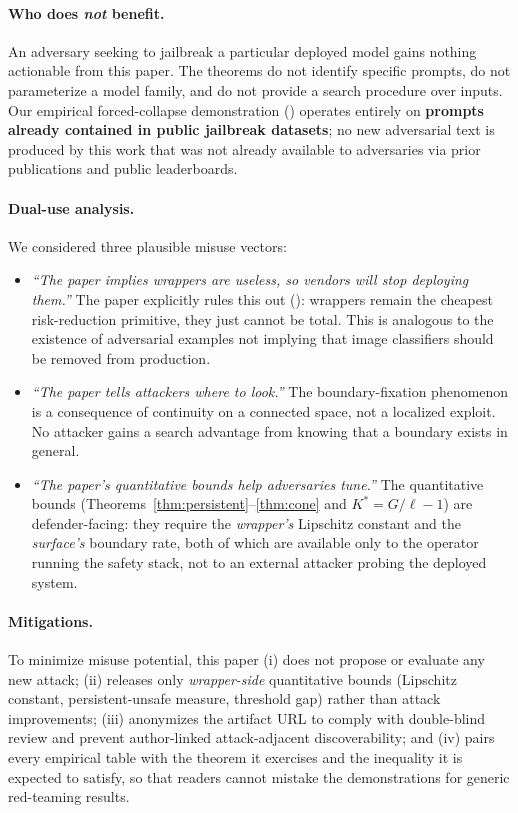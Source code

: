 \paragraph{Who does \emph{not} benefit.}
An adversary seeking to jailbreak a particular deployed model gains
nothing actionable from this paper. The theorems do not identify
specific prompts, do not parameterize a model family, and do not
provide a search procedure over inputs. Our empirical forced-collapse
demonstration ()
operates entirely on \textbf{prompts already contained in public
jailbreak datasets}; no new adversarial text is produced by this
work that was not already available to adversaries via prior
publications and public leaderboards.

\paragraph{Dual-use analysis.}
We considered three plausible misuse vectors:
\begin{itemize}[nosep,leftmargin=1.6em]
  \item \emph{``The paper implies wrappers are useless, so vendors
        will stop deploying them.''} The paper explicitly rules this
        out (): wrappers remain the
        cheapest risk-reduction primitive, they just cannot be
        total. This is analogous to the existence of adversarial
        examples not implying that image classifiers should be
        removed from production.
  \item \emph{``The paper tells attackers where to look.''} The
        boundary-fixation phenomenon is a consequence of continuity
        on a connected space, not a localized exploit. No attacker
        gains a search advantage from knowing that a boundary exists
        in general.
  \item \emph{``The paper's quantitative bounds help adversaries
        tune.''} The quantitative bounds
        (Theorems~\ref{thm:persistent}--\ref{thm:cone} and
        $K^{*} = G/\ell - 1$) are defender-facing: they require the
        \emph{wrapper's} Lipschitz constant and the \emph{surface's}
        boundary rate, both of which are available only to the
        operator running the safety stack, not to an external
        attacker probing the deployed system.
\end{itemize}

\paragraph{Mitigations.}
To minimize misuse potential, this paper (i) does not propose or
evaluate any new attack; (ii) releases only \emph{wrapper-side}
quantitative bounds (Lipschitz constant, persistent-unsafe measure,
threshold gap) rather than attack improvements; (iii) anonymizes the
artifact URL to comply with double-blind review and prevent
author-linked attack-adjacent discoverability; and (iv) pairs every
empirical table with the theorem it exercises and the inequality it
is expected to satisfy, so that readers cannot mistake the
demonstrations for generic red-teaming results.

